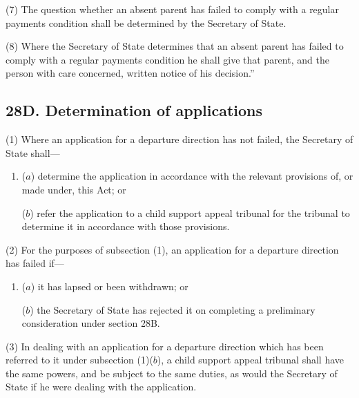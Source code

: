 \documentclass[12pt,a4paper]{article}
\begin{document}
(7) The question whether an absent parent has failed to comply with a regular payments condition shall be determined by the Secretary of State.

(8) Where the Secretary of State determines that an absent parent has failed to comply with a regular payments condition he shall give that parent, and the person with care concerned, written notice of his decision.”


\subsection{28D. Determination of applications}

(1) Where an application for a departure direction has not failed, the Secretary of State shall—
\begin{enumerate}\item[]
($a$) determine the application in accordance with the relevant provisions of, or made under, this Act; or

($b$) refer the application to 
a child support appeal tribunal 
for the tribunal to determine it in accordance with those provisions.
\end{enumerate}

(2) For the purposes of subsection (1), an application for a departure direction has failed if—
\begin{enumerate}\item[]
($a$) it has lapsed or been withdrawn; or

($b$) the Secretary of State has rejected it on completing a preliminary consideration under section 28B.
\end{enumerate}

(3) In dealing with an application for a departure direction which has been referred to it under subsection (1)($b$), 
a child support appeal tribunal 
shall have the same powers, and be subject to the same duties, as would the Secretary of State if he were dealing with the application.

\end{document}
